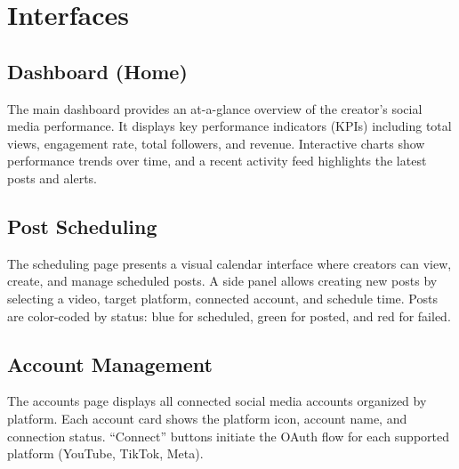 \section{Interfaces}

\subsection{Dashboard (Home)}

The main dashboard provides an at-a-glance overview of the creator's social media performance. It displays key performance indicators (KPIs) including total views, engagement rate, total followers, and revenue. Interactive charts show performance trends over time, and a recent activity feed highlights the latest posts and alerts.


\subsection{Post Scheduling}

The scheduling page presents a visual calendar interface where creators can view, create, and manage scheduled posts. A side panel allows creating new posts by selecting a video, target platform, connected account, and schedule time. Posts are color-coded by status: blue for scheduled, green for posted, and red for failed.


\subsection{Account Management}

The accounts page displays all connected social media accounts organized by platform. Each account card shows the platform icon, account name, and connection status. ``Connect'' buttons initiate the OAuth flow for each supported platform (YouTube, TikTok, Meta).

